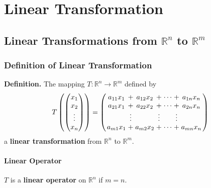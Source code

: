 \documentclass[../ma2001_notes.tex]{subfiles}
\begin{document}
\chapter{Linear Transformation}
\section{Linear Transformations from $\mathbb{R}^n$ to $\mathbb{R}^m$}
\subsection{Definition of Linear Transformation}
\textbf{Definition.} The mapping \(T:\mathbb{R}^n\to\mathbb{R}^m\) defined by
\[T\left(\begin{pmatrix}
	x_1 \\ x_2 \\ \vdots \\ x_n
\end{pmatrix}\right)=\left(
\arraycolsep=1.4pt\begin{array}{ccccccc}
	a_{11}x_1 & + & a_{12}x_2 & + & \cdots & + & a_{1n}x_n \\
	a_{21}x_1 & + & a_{22}x_2 & + & \cdots & + & a_{2n}x_n \\
	& \vdots & & \vdots & & \vdots & \\
	a_{m1}x_1 & + & a_{m2}x_2 & + & \cdots & + & a_{mn}x_n \\
\end{array}\right)\]
a \textbf{linear transformation} from \(\mathbb{R}^n\) to \(\mathbb{R}^m\).

\subsubsection{Linear Operator}
\(T\) is a \textbf{linear operator} on \(\mathbb{R}^n\) if \(m=n\).
\end{document}

